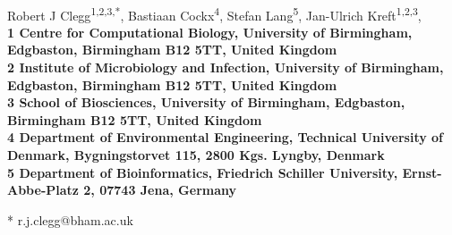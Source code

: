 \documentclass[10pt,letterpaper]{article}
\date{}
\begin{document}
\vspace*{0.35in}

\begin{flushleft}
{\Large
\textbf{}
}
\newline
\\
Robert J Clegg\textsuperscript{1,2,3,*},
Bastiaan Cockx\textsuperscript{4},
Stefan Lang\textsuperscript{5},
Jan-Ulrich Kreft\textsuperscript{1,2,3},
\\
\bigskip
\bf{1} Centre for Computational Biology, University of Birmingham, Edgbaston, Birmingham B12 5TT, United Kingdom
\\
\bf{2} Institute of Microbiology and Infection, University of Birmingham, Edgbaston, Birmingham B12 5TT, United Kingdom
\\
\bf{3} School of Biosciences, University of Birmingham, Edgbaston, Birmingham B12 5TT, United Kingdom
\\
\bf{4} Department of Environmental Engineering, Technical University of Denmark, Bygningstorvet 115, 2800 Kgs. Lyngby, Denmark 
\\
\bf{5} Department of Bioinformatics, Friedrich Schiller University, Ernst-Abbe-Platz 2, 07743 Jena, Germany 
\\
\bigskip

% 
%





* r.j.clegg@bham.ac.uk

\end{flushleft}
\end{document}
